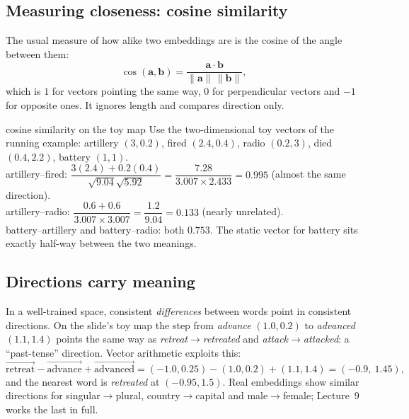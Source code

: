\documentclass[11pt]{article}
\begin{document}
\subsection{Measuring closeness: cosine similarity}
The usual measure of how alike two embeddings are is the cosine of the angle between them:
\[\cos(\mathbf a,\mathbf b)=\frac{\mathbf a\cdot\mathbf b}{\lVert\mathbf a\rVert\,\lVert\mathbf b\rVert},\]
which is $1$ for vectors pointing the same way, $0$ for perpendicular vectors and $-1$ for opposite ones. It ignores length and compares direction only.
\begin{example}{cosine similarity on the toy map}
Use the two-dimensional toy vectors of the running example: artillery $(3,0.2)$, fired $(2.4,0.4)$, radio $(0.2,3)$, died $(0.4,2.2)$, battery $(1,1)$.\\
artillery--fired: $\dfrac{3(2.4)+0.2(0.4)}{\sqrt{9.04}\sqrt{5.92}}=\dfrac{7.28}{3.007\times2.433}=0.995$ (almost the same direction).\\
artillery--radio: $\dfrac{0.6+0.6}{3.007\times3.007}=\dfrac{1.2}{9.04}=0.133$ (nearly unrelated).\\
battery--artillery and battery--radio: both $0.753$. The static vector for battery sits exactly half-way between the two meanings.
\end{example}

\subsection{Directions carry meaning}
In a well-trained space, consistent \emph{differences} between words point in consistent directions. On the slide's toy map the step from \emph{advance} $(1.0,0.2)$ to \emph{advanced} $(1.1,1.4)$ points the same way as \emph{retreat}$\to$\emph{retreated} and \emph{attack}$\to$\emph{attacked}: a ``past-tense'' direction. Vector arithmetic exploits this:
\[\overrightarrow{\text{retreat}}-\overrightarrow{\text{advance}}+\overrightarrow{\text{advanced}}=(-1.0,0.25)-(1.0,0.2)+(1.1,1.4)=(-0.9,\ 1.45),\]
and the nearest word is \emph{retreated} at $(-0.95,1.5)$. Real embeddings show similar directions for singular$\to$plural, country$\to$capital and male$\to$female; Lecture~9 works the last in full.
\end{document}
